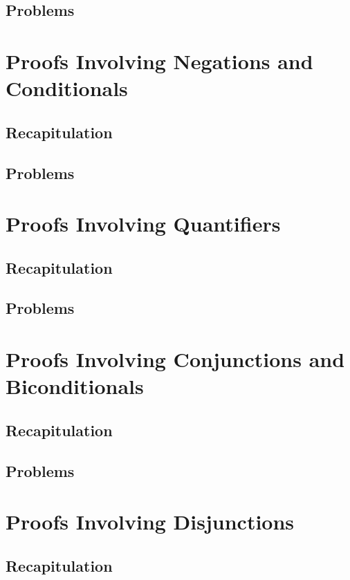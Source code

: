 \documentclass{report}
\begin{document}
        \subsection{Problems}
        
    \section{Proofs Involving Negations and Conditionals}
        \subsection{Recapitulation}
        
        \subsection{Problems}
        
    \section{Proofs Involving Quantifiers}
        \subsection{Recapitulation}
        
        \subsection{Problems}
        
    \section{Proofs Involving Conjunctions and Biconditionals}
        \subsection{Recapitulation}
        \subsection{Problems}
    \section{Proofs Involving Disjunctions}
        \subsection{Recapitulation}
\end{document}
